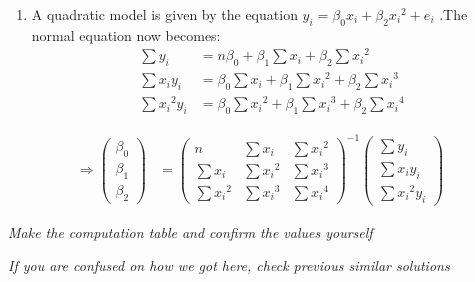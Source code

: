 \documentclass[
]{article}
\providecommand{\tightlist}{%
  \setlength{\itemsep}{0pt}\setlength{\parskip}{0pt}}
\begin{document}
\begin{enumerate}
\def\labelenumi{\alph{enumi}.}
\tightlist
\item
  A quadratic model is given by the equation
  \(y_i = \beta_0 x_i + \beta_2 {x_i}^2 + e_i\) .The normal equation now
  becomes: \begin{align*}
    \sum y_i & = n\beta_0 + \beta_1 \sum x_i + \beta_2 \sum {x_i}^2    \\
    \sum x_iy_i & = \beta_0 \sum x_i + \beta_1\sum {x_i}^2  + \beta_2 \sum x_i{^3} \\
    \sum x_i{^2}y_i & = \beta_0 \sum x_i{^2} + \beta_1\sum x_i{^3}  + \beta_2 \sum x_i{^4}
  \end{align*}
\end{enumerate}

\begin{align*}
  \Rightarrow
    \begin{pmatrix}
      \beta_0\\
      \beta_1 \\
      \beta_2
    \end{pmatrix}
    & =
    \begin{pmatrix}
     n &  \sum x_i &  \sum x_i{^2}\\
     \sum x_i & \sum x_i{^2} & \sum x_i{^3} \\
     \sum x_i{^2} & \sum x_i{^3} & \sum x_i{^4}
  \end{pmatrix}^{-1}
  
  \begin{pmatrix}
    \sum y_i\\
    \sum x_iy_i \\
    \sum x_i{^2}y_i
  \end{pmatrix}
\end{align*}

\emph{Make the computation table and confirm the values yourself}

\emph{If you are confused on how we got here, check previous similar
solutions}
\end{document}
